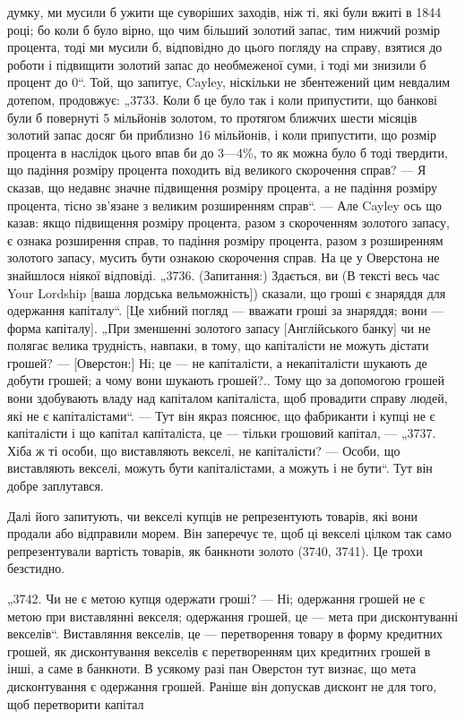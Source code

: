 \parcont{}  %
думку, ми мусили б ужити ще суворіших заходів, ніж ті, які
були вжиті в 1844 році; бо коли б було вірно, що чим більший
золотий запас, тим нижчий розмір процента, тоді ми мусили б,
відповідно до цього погляду на справу, взятися до роботи і підвищити золотий запас до необмеженої
суми, і тоді ми знизили б
процент до 0“. Той, що запитує, Cayley, ніскільки не збентежений цим невдалим дотепом, продовжує:
„3733. Коли б це
було так і коли припустити, що банкові були б повернуті
5 мільйонів золотом, то протягом ближчих шести місяців золотий запас досяг би приблизно 16
мільйонів, і коли припустити,
що розмір процента в наслідок цього впав би до 3—4\%, то
як можна було б тоді твердити, що падіння розміру процента
походить від великого скорочення справ? — Я сказав, що недавнє значне підвищення розміру процента, а
не падіння розміру
процента, тісно зв’язане з великим розширенням справ“. — Але
Cayley ось що казав: якщо підвищення розміру процента, разом з скороченням золотого запасу, є ознака
розширення справ,
то падіння розміру процента, разом з розширенням золотого
запасу, мусить бути ознакою скорочення справ. На це у
Оверстона не знайшлося ніякої відповіді. „3736. (Запитання:)
Здається, ви (В тексті весь час Your Lordship [ваша лордська
вельможність]) сказали, що гроші є знаряддя для одержання
капіталу“. [Це хибний погляд — вважати гроші за знаряддя; вони — форма капіталу]. „При зменшенні
золотого запасу [Англійського банку] чи не полягає велика трудність, навпаки, в тому,
що капіталісти не можуть дістати грошей? — [Оверстон:]
Ні; це — не капіталісти, а некапіталісти шукають де добути
грошей; а чому вони шукають грошей?.. Тому що за допомогою
грошей вони здобувають владу над капіталом капіталіста, щоб
провадити справу людей, які не є капіталістами“. — Тут він
якраз пояснює, що фабриканти і купці не є капіталісти і що
капітал капіталіста, це — тільки грошовий капітал, — „3737. Хіба ж
ті особи, що виставляють векселі, не капіталісти? — Особи,
що виставляють векселі, можуть бути капіталістами, а можуть
і не бути“. Тут він добре заплутався.

Далі його запитують, чи векселі купців не репрезентують
товарів, які вони продали або відправили морем. Він заперечує те, щоб ці векселі цілком так само
репрезентували
вартість товарів, як банкноти золото (3740, 3741). Це трохи
безстидно.

„3742. Чи не є метою купця одержати гроші? — Ні; одержання грошей не є метою при виставлянні
векселя; одержання
грошей, це — мета при дисконтуванні векселів“. Виставляння
векселів, це — перетворення товару в форму кредитних грошей,
як дисконтування векселів є перетворенням цих кредитних грошей в інші, а саме в банкноти. В усякому
разі пан Оверстон тут
визнає, що мета дисконтування є одержання грошей. Раніше
він допускав дисконт не для того, щоб перетворити капітал
\parbreak{}  %
